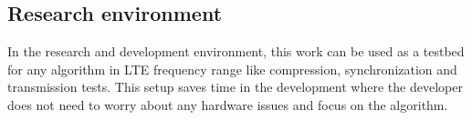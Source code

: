 \subsection{Research environment}

In the research and development environment, this work can be used as a testbed
for any algorithm in LTE frequency range like compression, synchronization and
transmission tests. This setup saves time in the development where the developer
does not need to worry about any hardware issues and focus on the algorithm.
